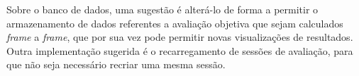 Sobre o banco de dados, uma sugestão é alterá-lo de forma a permitir o armazenamento de dados referentes a avaliação objetiva que sejam calculados \emph{frame} a \emph{frame}, que por sua vez pode permitir novas visualizações de resultados. Outra  implementação sugerida é o recarregamento de sessões de avaliação, para que não seja necessário recriar uma mesma sessão.


